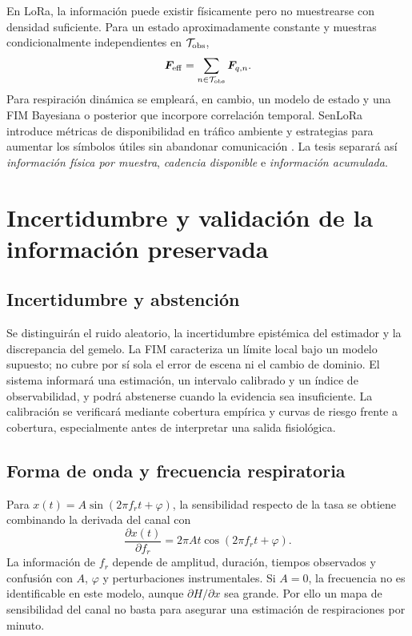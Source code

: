 En LoRa, la información puede existir físicamente pero no muestrearse con densidad suficiente. Para un estado aproximadamente constante y muestras condicionalmente independientes en $\mathcal T_{\rm obs}$,
\begin{equation}
\bm{F}_{\rm eff}=
\sum_{n\in\mathcal T_{\rm obs}}\bm{F}_{q,n}.
\end{equation}
Para respiración dinámica se empleará, en cambio, un modelo de estado y una FIM Bayesiana o posterior que incorpore correlación temporal. SenLoRa introduce métricas de disponibilidad en tráfico ambiente y estrategias para aumentar los símbolos útiles sin abandonar comunicación \citep{SenLoRa2025}. La tesis separará así \emph{información física por muestra}, \emph{cadencia disponible} e \emph{información acumulada}.

\section{Incertidumbre y validación de la información preservada}

\subsection{Incertidumbre y abstención}

Se distinguirán el ruido aleatorio, la incertidumbre epistémica del estimador y la discrepancia del gemelo. La FIM caracteriza un límite local bajo un modelo supuesto; no cubre por sí sola el error de escena ni el cambio de dominio. El sistema informará una estimación, un intervalo calibrado y un índice de observabilidad, y podrá abstenerse cuando la evidencia sea insuficiente. La calibración se verificará mediante cobertura empírica y curvas de riesgo frente a cobertura, especialmente antes de interpretar una salida fisiológica.

\subsection{Forma de onda y frecuencia respiratoria}

Para $x(t)=A\sin(2\pi f_rt+\varphi)$, la sensibilidad respecto de la tasa se
obtiene combinando la derivada del canal con
\begin{equation}
\frac{\partial x(t)}{\partial f_r}=2\pi At\cos(2\pi f_rt+\varphi).
\end{equation}
La información de $f_r$ depende de amplitud, duración, tiempos observados y
confusión con $A$, $\varphi$ y perturbaciones instrumentales. Si $A=0$, la
frecuencia no es identificable en este modelo, aunque $\partial H/\partial x$
sea grande. Por ello un mapa de sensibilidad del canal no basta para asegurar
una estimación de respiraciones por minuto.

